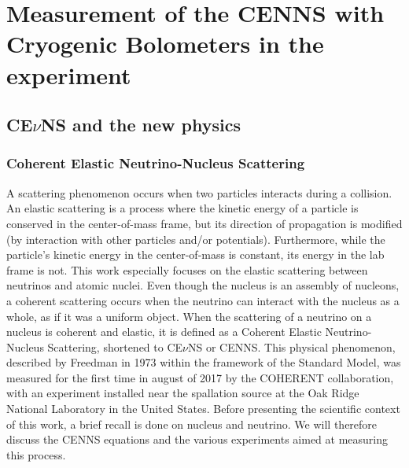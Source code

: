 
\chapter{Measurement of the CENNS with Cryogenic Bolometers in the \Ricochet{} experiment} %

\label{ChapterIntro} %


\section{CE$\nu$NS and the new physics}

\subsection{Coherent Elastic Neutrino-Nucleus Scattering}

A scattering phenomenon occurs when two particles interacts during a collision.
An elastic scattering is a process where the kinetic energy of a particle is conserved in the center-of-mass frame, but its direction of propagation is modified (by interaction with other particles and/or potentials). Furthermore, while the particle's kinetic energy in the center-of-mass is constant, its energy in the lab frame is not.
This work especially focuses on the elastic scattering between neutrinos and atomic nuclei. Even though the nucleus is an assembly of nucleons, a coherent scattering occurs when the neutrino can interact with the nucleus as a whole, as if it was a uniform object.
When the scattering of a neutrino on a nucleus is coherent and elastic, it is defined as a Coherent Elastic Neutrino-Nucleus Scattering, shortened to CE$\nu$NS or CENNS.
This physical phenomenon, described by Freedman in 1973 within the framework of the Standard Model, was  measured for the first time in august of 2017 by the COHERENT collaboration, with an experiment installed near the spallation source at the Oak Ridge National Laboratory in the United States.
Before presenting the scientific context of this work, a brief recall is done on nucleus and neutrino. We will therefore discuss the CENNS equations and the various experiments aimed at measuring this process.


